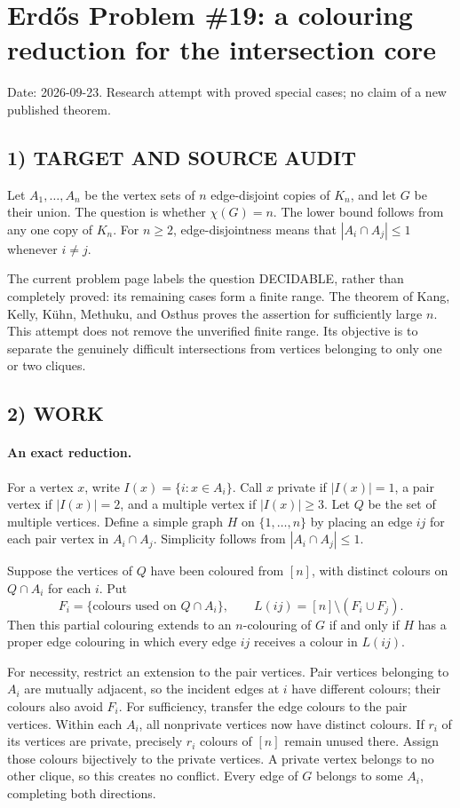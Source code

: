 \section{Erd\H{o}s Problem \#19: a colouring reduction for the intersection core}
\noindent Date: 2026-09-23. Research attempt with proved special cases; no claim of a new published theorem.

\subsection{1) TARGET AND SOURCE AUDIT}
Let $A_1,\ldots,A_n$ be the vertex sets of $n$ edge-disjoint copies of $K_n$, and let $G$ be their union. The question is whether $\chi(G)=n$. The lower bound follows from any one copy of $K_n$. For $n\ge2$, edge-disjointness means that $|A_i\cap A_j|\le1$ whenever $i\ne j$.

The current problem page labels the question DECIDABLE, rather than completely proved: its remaining cases form a finite range. The theorem of Kang, Kelly, K\"uhn, Methuku, and Osthus proves the assertion for sufficiently large $n$. This attempt does not remove the unverified finite range. Its objective is to separate the genuinely difficult intersections from vertices belonging to only one or two cliques.

\subsection{2) WORK}
\paragraph{An exact reduction.}
For a vertex $x$, write $I(x)=\{i:x\in A_i\}$. Call $x$ private if $|I(x)|=1$, a pair vertex if $|I(x)|=2$, and a multiple vertex if $|I(x)|\ge3$. Let $Q$ be the set of multiple vertices. Define a simple graph $H$ on $\{1,\ldots,n\}$ by placing an edge $ij$ for each pair vertex in $A_i\cap A_j$. Simplicity follows from $|A_i\cap A_j|\le1$.

Suppose the vertices of $Q$ have been coloured from $[n]$, with distinct colours on $Q\cap A_i$ for each $i$. Put
\[
F_i=\{\text{colours used on }Q\cap A_i\},\qquad
L(ij)=[n]\setminus(F_i\cup F_j).
\]
Then this partial colouring extends to an $n$-colouring of $G$ if and only if $H$ has a proper edge colouring in which every edge $ij$ receives a colour in $L(ij)$.

For necessity, restrict an extension to the pair vertices. Pair vertices belonging to $A_i$ are mutually adjacent, so the incident edges at $i$ have different colours; their colours also avoid $F_i$. For sufficiency, transfer the edge colours to the pair vertices. Within each $A_i$, all nonprivate vertices now have distinct colours. If $r_i$ of its vertices are private, precisely $r_i$ colours of $[n]$ remain unused there. Assign those colours bijectively to the private vertices. A private vertex belongs to no other clique, so this creates no conflict. Every edge of $G$ belongs to some $A_i$, completing both directions.

